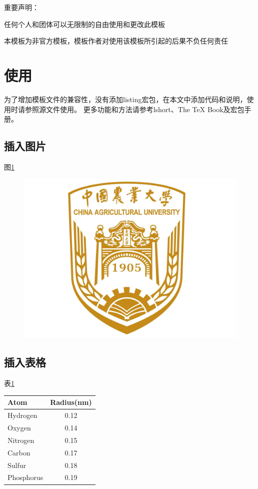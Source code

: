 \documentclass[twoside,maketable]{cauthesis}
\begin{document}
	重要声明：
	\begin{level}{1}
		\item 任何个人和团体可以无限制的自由使用和更改此模板
		\item 本模板为非官方模板，模板作者对使用该模板所引起的后果不负任何责任
	\end{level}

\section{使用}
	为了增加模板文件的兼容性，没有添加listing宏包，在本文中添加代码和说明，使用时请参照源文件使用。
	更多功能和方法请参考lshort、The TeX Book及宏包手册。

	\subsection{插入图片}
		图\ref{fig:1}%
		\begin{figure}[H]
			\centering
			\includegraphics{./Picture/Logo.jpg}
			\label{fig:1}%
		\end{figure}

	\subsection{插入表格}
		表\ref{tab:1}%
		\begin{table}[H]
			\centering
			\begin{tabular}{lc}
				\hline
				Atom       & Radius(nm) \\
				\hline
				Hydrogen   & 0.12       \\
				Oxygen     & 0.14       \\
				Nitrogen   & 0.15       \\
				Carbon     & 0.17       \\
				Sulfur     & 0.18       \\
				Phosphorus & 0.19       \\
				\hline
			\end{tabular}
			\label{tab:1}%
		\end{table}
\end{document}
